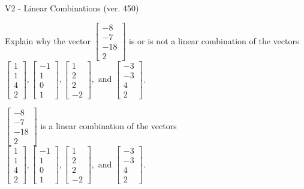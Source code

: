 \begin{exercise}
  \begin{exerciseTitle}V2 - Linear Combinations (ver. 450)\end{exerciseTitle}
  \begin{exerciseStatement}
    Explain why the vector \(\left[\begin{array}{c}
-8 \\
-7 \\
-18 \\
2
\end{array}\right]\)  is or is not a linear 
	combination of the vectors \(\left[\begin{array}{c}
1 \\
1 \\
4 \\
2
\end{array}\right] , \left[\begin{array}{c}
-1 \\
1 \\
0 \\
1
\end{array}\right] , \left[\begin{array}{c}
1 \\
2 \\
2 \\
-2
\end{array}\right] , \text{ and } \left[\begin{array}{c}
-3 \\
-3 \\
4 \\
2
\end{array}\right]\).
	


  \end{exerciseStatement}
  \begin{exerciseAnswer}
   \(\left[\begin{array}{c}
-8 \\
-7 \\
-18 \\
2
\end{array}\right]\) 
  	 is  
	a linear combination of the vectors \(\left[\begin{array}{c}
1 \\
1 \\
4 \\
2
\end{array}\right] , \left[\begin{array}{c}
-1 \\
1 \\
0 \\
1
\end{array}\right] , \left[\begin{array}{c}
1 \\
2 \\
2 \\
-2
\end{array}\right] , \text{ and } \left[\begin{array}{c}
-3 \\
-3 \\
4 \\
2
\end{array}\right]\).


\end{exerciseAnswer}
\end{exercise}
